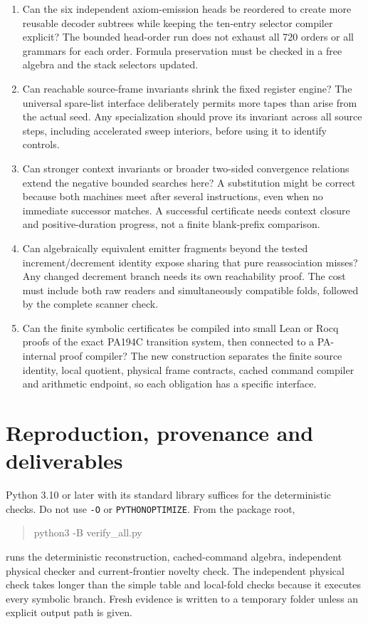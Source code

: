\documentclass[11pt,letterpaper]{article}
\newcommand{\file}[1]{\texttt{\nolinkurl{#1}}}
\begin{document}
\begin{enumerate}
\item Can the six independent axiom-emission heads be reordered to create
more reusable decoder subtrees while keeping the ten-entry selector compiler
explicit? The bounded head-order run does not exhaust all 720 orders or all
grammars for each order. Formula preservation must be checked in
a free algebra and the stack selectors updated.
\item Can reachable source-frame invariants shrink the fixed register engine?
The universal spare-list interface deliberately permits more tapes than arise
from the actual seed. Any specialization should prove its invariant across
all source steps, including accelerated sweep interiors, before using it to
identify controls.
\item Can stronger context invariants or broader two-sided convergence
relations extend the negative bounded searches here? A substitution might be
correct because both machines meet after
several instructions, even when no immediate successor matches. A successful
certificate needs context closure and positive-duration progress, not a finite
blank-prefix comparison.
\item Can algebraically equivalent emitter fragments beyond the tested
increment/decrement identity expose sharing that pure reassociation misses?
Any changed decrement branch needs its own reachability proof.
The cost must include both raw readers
and simultaneously compatible folds, followed by the complete scanner check.
\item Can the finite symbolic certificates be compiled into small Lean or
Rocq proofs of the exact PA194C transition system, then connected to a
PA-internal proof compiler? The new construction separates the finite source
identity, local quotient, physical frame contracts, cached command compiler
and arithmetic endpoint, so each obligation has a specific interface.
\end{enumerate}

\section{Reproduction, provenance and deliverables}

Python 3.10 or later with its standard library suffices for the deterministic
checks. Do not use \file{-O} or \file{PYTHONOPTIMIZE}. From the package root,
\begin{quote}\ttfamily
python3 -B verify\_all.py
\end{quote}
runs the deterministic reconstruction, cached-command algebra, independent
physical checker and current-frontier novelty check. The independent physical
check takes longer than the simple table and local-fold checks because it
executes every symbolic branch. Fresh evidence is written to a temporary
folder unless an explicit output path is given.
\end{document}
